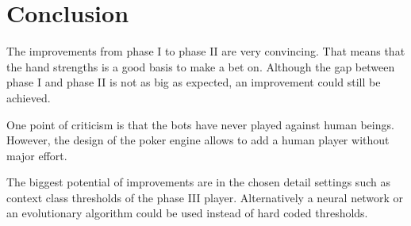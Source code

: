\chapter{Conclusion}
The improvements from phase I to phase II are very convincing. That means that the hand strengths is a good basis to make a bet on. Although the gap between phase I and phase II is not as big as expected, an improvement could still be achieved.

One point of criticism is that the bots have never played against human beings. However, the design of the poker engine allows to add a human player without major effort.

The biggest potential of improvements are in the chosen detail settings such as context class thresholds of the phase III player. Alternatively a neural network or an evolutionary algorithm could be used instead of hard coded thresholds.

